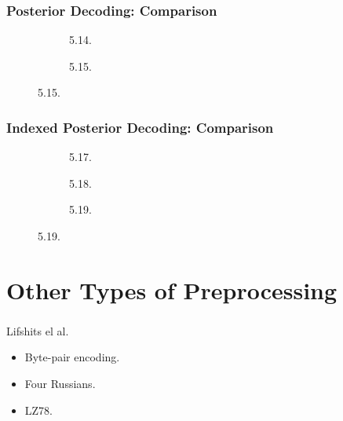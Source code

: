 \documentclass[english,notes]{beamer}
\begin{document}
\begin{frame}
  \frametitle{Posterior Decoding: Comparison}
  \begin{figure}
    \centering
    \begin{subfigure}{0.5\textwidth}
      \centering 
      \caption{5.14.}
    \end{subfigure}\hspace{-5mm}%
    \begin{subfigure}{0.5\textwidth}
      \centering 
      \caption{5.15.}
    \end{subfigure}
  \end{figure}
\end{frame}

\begin{frame}
  \frametitle{Indexed Posterior Decoding: Comparison}
  \begin{figure}
    \centering
    \begin{subfigure}{0.33\textwidth}
      \centering 
      \caption{5.17.}
    \end{subfigure}\hspace{-5mm}%
    \begin{subfigure}{0.33\textwidth}
      \centering 
      \caption{5.18.}
    \end{subfigure}\hspace{-5mm}%
    \begin{subfigure}{0.33\textwidth}
      \centering 
      \caption{5.19.}
    \end{subfigure}
  \end{figure}
\end{frame}

\section{Other Types of Preprocessing}

\begin{frame}
  \frametitle{\insertsection}
  \begin{block}{Lifshits el al.}
    \begin{itemize}
    \item Byte-pair encoding.
    \item Four Russians.
    \item LZ78.
    \end{itemize}
  \end{block}
\end{frame}
\end{document}
